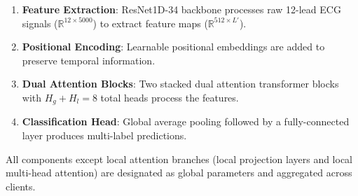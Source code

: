 \begin{enumerate}
    \item \textbf{Feature Extraction}: ResNet1D-34 backbone processes raw 12-lead ECG signals ($\mathbb{R}^{12 \times 5000}$) to extract feature maps ($\mathbb{R}^{512 \times L'}$).

    \item \textbf{Positional Encoding}: Learnable positional embeddings are added to preserve temporal information.

    \item \textbf{Dual Attention Blocks}: Two stacked dual attention transformer blocks with $H_g + H_l = 8$ total heads process the features.

    \item \textbf{Classification Head}: Global average pooling followed by a fully-connected layer produces multi-label predictions.
\end{enumerate}

All components except local attention branches (local projection layers and local multi-head attention) are designated as global parameters and aggregated across clients.
